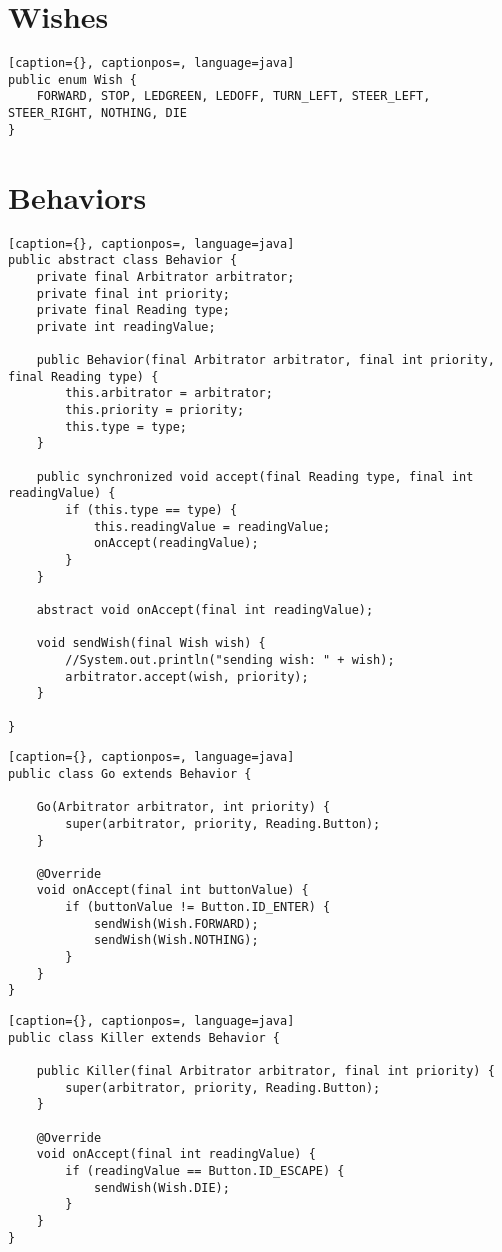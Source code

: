 \section{Wishes}
\begin{lstlisting}[caption={}, captionpos=, language=java]
public enum Wish {
	FORWARD, STOP, LEDGREEN, LEDOFF, TURN_LEFT, STEER_LEFT, STEER_RIGHT, NOTHING, DIE
}
\end{lstlisting}

\section{Behaviors}
\begin{lstlisting}[caption={}, captionpos=, language=java]
public abstract class Behavior {
	private final Arbitrator arbitrator;
	private final int priority;
	private final Reading type;
	private int readingValue;

	public Behavior(final Arbitrator arbitrator, final int priority, final Reading type) {
		this.arbitrator = arbitrator;
		this.priority = priority;
		this.type = type;
	}

	public synchronized void accept(final Reading type, final int readingValue) {
		if (this.type == type) {
			this.readingValue = readingValue;
			onAccept(readingValue);
		}
	}

	abstract void onAccept(final int readingValue);

	void sendWish(final Wish wish) {
		//System.out.println("sending wish: " + wish);
		arbitrator.accept(wish, priority);
	}

}
\end{lstlisting}

\begin{lstlisting}[caption={}, captionpos=, language=java]
public class Go extends Behavior {

	Go(Arbitrator arbitrator, int priority) {
		super(arbitrator, priority, Reading.Button);
	}

	@Override
	void onAccept(final int buttonValue) {
		if (buttonValue != Button.ID_ENTER) {
			sendWish(Wish.FORWARD);
			sendWish(Wish.NOTHING);
		}
	}
}
\end{lstlisting}

\begin{lstlisting}[caption={}, captionpos=, language=java]
public class Killer extends Behavior {

	public Killer(final Arbitrator arbitrator, final int priority) {
		super(arbitrator, priority, Reading.Button);
	}

	@Override
	void onAccept(final int readingValue) {
		if (readingValue == Button.ID_ESCAPE) {
			sendWish(Wish.DIE);
		}
	}
}
\end{lstlisting}

